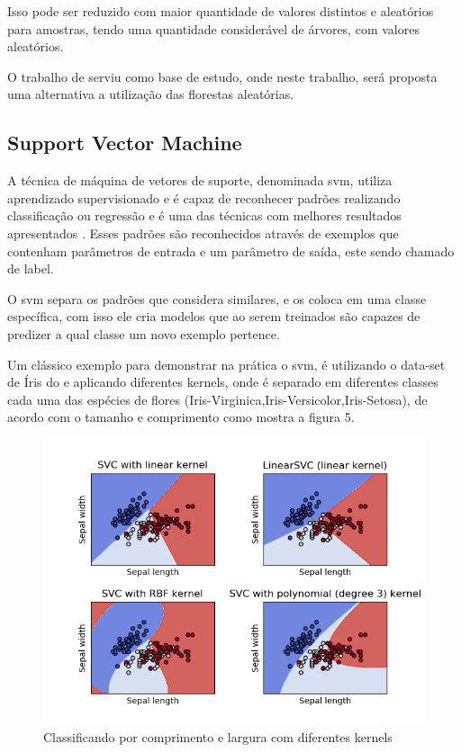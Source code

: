 \documentclass[tcc, capa]{texucpel}
\begin{document}
Isso pode ser reduzido com maior quantidade de valores distintos e aleatórios para amostras, tendo uma quantidade considerável de árvores, com valores aleatórios.

O trabalho de \cite{ballester2010machine} serviu como base de estudo, onde neste trabalho, será proposta uma alternativa a utilização das florestas aleatórias.

\subsection{Support Vector Machine}

A técnica de máquina de vetores de suporte, denominada svm, utiliza aprendizado supervisionado e é capaz de reconhecer padrões realizando classificação ou regressão e é uma das técnicas com melhores resultados apresentados \cite{lorena2007introduccao}. 
Esses padrões são reconhecidos através de exemplos que contenham parâmetros de entrada e um parâmetro de saída, este sendo chamado de label.

O svm separa os padrões que considera similares, e os coloca em uma classe específica, com isso ele cria modelos que ao serem treinados são capazes de predizer a qual classe um novo exemplo pertence\cite{boser1992training}.

Um clássico exemplo para demonstrar na prática o svm, é utilizando o data-set de Íris do \cite{fisher1936use} e aplicando diferentes kernels,  onde é separado em diferentes classes cada uma das espécies de flores (Iris-Virginica,Iris-Versicolor,Iris-Setosa), de acordo com o tamanho e comprimento como mostra a figura 5. 

    \begin{figure}[h]
	\centering
    \includegraphics[width=0.90\linewidth]{imagens/exemplo_svm.png}
	\caption{Classificando por comprimento e largura com diferentes kernels}
	\end{figure}
    \FloatBarrier
\end{document}

